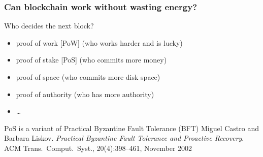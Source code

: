 \documentclass[11pt]{beamer}  %
\begin{document}
\begin{frame}
  \frametitle{Can blockchain work without wasting energy?}

  \begin{center}
    Who decides the next block?
  \end{center}

  \bigskip

  \begin{greenbox}{}
    \begin{itemize}
    \item proof of work [PoW] (who works harder and is lucky)
    \item proof of stake [PoS] (who commits more money)
    \item proof of space (who commits more disk space)
    \item proof of authority (who has more authority)
    \item \ldots
    \end{itemize}
  \end{greenbox}

  \bigskip

  \begin{greenbox}{PoS is a variant of Practical Byzantine Fault Tolerance (BFT)}
    Miguel Castro and Barbara Liskov.
    \emph{Practical Byzantine Fault Tolerance and Proactive Recovery}.
    ACM Trans.\ Comput.\ Syst., 20(4):398–461, November 2002
  \end{greenbox}

\end{frame}
\end{document}
